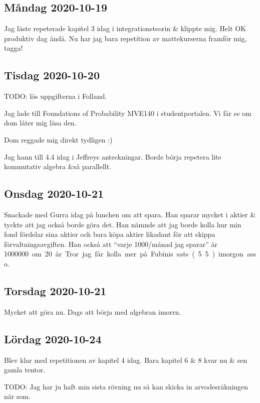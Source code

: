 \subsection{Måndag 2020-10-19}

Jag läste repeterade kapitel 3 idag i integrationsteorin \& klippte mig. Helt OK produktiv dag ändå. Nu har jag bara repetition av mattekurserna framför mig, tagga!


\subsection{Tisdag 2020-10-20}

TODO: lös uppgifterna i Folland.

Jag lade till Foundations of Probability MVE140 i studentportalen. Vi får se om dom låter mig läsa den.

Dom reggade mig direkt tydligen :)

Jag hann till 4.4 idag i Jeffreys anteckningar. Borde börja repetera lite kommutativ algebra \&så parallellt.


\subsection{Onsdag 2020-10-21}

Snackade med Gurra idag på lunchen om att spara. Han sparar mycket i aktier \& tyckte att jag också borde göra det. Han nämnde att jag borde kolla hur min fond fördelar sina aktier och bara köpa aktier likadant för att skippa förvaltningsavgiften. Han också att \enquote{varje 1000/månad jag sparar} är \SI{1000000} om 20 år.

Tror jag får kolla mer på Fubinis sats (5.5) imorgon asso.

\subsection{Torsdag 2020-10-21}

Mycket att göra nu. Dags att börja med algebran imorrn.

\subsection{Lördag 2020-10-24}

Blev klar med repetitionen av kapitel 4 idag. Bara kapitel 6 \& 8 kvar nu \& sen gamla tentor.

TODO: Jag har ju haft min sista rövning nu så kan skicka in arvodesräkningen när som.

